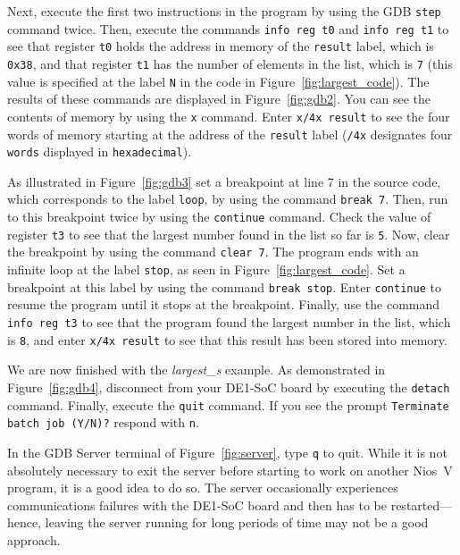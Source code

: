 \documentclass[11pt, twoside, pdftex]{article}
\begin{document}
Next, execute the first two instructions in the program by using the 
GDB \texttt{step} command twice. Then, execute the commands 
\texttt{info reg t0} and \texttt{info reg t1} to see that register \texttt{t0} 
holds the address in memory of the \texttt{result} label, which is \texttt{0x38}, and that
register \texttt{t1} has the number of elements in the list, which is \texttt{7} (this value is
specified at the label \texttt{N} in the code in Figure~\ref{fig:largest_code}).
The results of these commands are displayed in Figure~\ref{fig:gdb2}. You can see the
contents of memory by using the \texttt{x} command. Enter \texttt{x/4x result} to see the
four words of memory starting at the address of the \texttt{result} label (\texttt{/4x}
designates four \texttt{words} displayed in \texttt{hexadecimal}).

As illustrated in Figure~\ref{fig:gdb3} set a breakpoint at line 7 in the source code,
which corresponds to the label \texttt{loop}, by using the command \texttt{break 7}.
Then, run to this breakpoint twice by using the \texttt{continue}
command. Check the value of register \texttt{t3} to see that the largest number found in
the list so far is \texttt{5}. 
Now, clear the breakpoint by using the command \texttt{clear 7}. The program ends with an 
infinite loop at the label \texttt{stop}, as seen in Figure~\ref{fig:largest_code}. Set a
breakpoint at this label by using the command \texttt{break stop}. Enter \texttt{continue} to 
resume the program until it stops at the breakpoint. 
Finally, use the command \texttt{info reg t3} to see that the program 
found the largest number in the list, which is \texttt{8}, and enter \texttt{x/4x result} 
to see that this result has been stored into memory.

We are now finished with the {\it largest\_s} example. As demonstrated in Figure~\ref{fig:gdb4},
disconnect from your DE1-SoC board by executing the \texttt{detach} command. Finally, execute
the \texttt{quit} command. If you see the prompt \texttt{Terminate batch job (Y/N)?}
respond with \texttt{n}.

In the GDB Server terminal of Figure~\ref{fig:server}, type \texttt{q} to quit. While
it is not absolutely necessary to exit the server before starting to work on another
Nios~V program, it is a good idea to do so. The server occasionally experiences
communications failures with the DE1-SoC board and then has to be restarted---hence, leaving 
the server running for long periods of time may not be a good approach.
        
\end{document}
